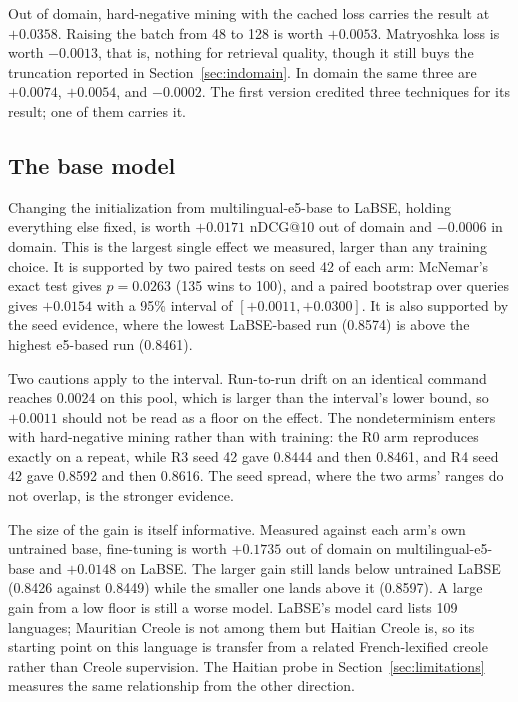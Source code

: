\documentclass[11pt]{article}
\begin{document}
Out of domain, hard-negative mining with the cached loss carries the result at $+0.0358$. Raising the
batch from 48 to 128 is worth $+0.0053$. Matryoshka loss is worth $-0.0013$, that is, nothing for
retrieval quality, though it still buys the truncation reported in Section~\ref{sec:indomain}. In domain
the same three are $+0.0074$, $+0.0054$, and $-0.0002$. The first version credited three techniques
for its result; one of them carries it.

\subsection{The base model}
\label{sec:basemodel}

Changing the initialization from multilingual-e5-base to LaBSE, holding everything else fixed, is
worth $+0.0171$ nDCG@10 out of domain and $-0.0006$ in domain. This is the largest single effect we
measured, larger than any training choice. It is supported by two paired tests on seed 42 of each
arm: McNemar's exact test gives $p = 0.0263$ (135 wins to 100), and a paired bootstrap over queries
gives $+0.0154$ with a 95\% interval of $[+0.0011, +0.0300]$. It is also supported by the seed
evidence, where the lowest LaBSE-based run (0.8574) is above the highest e5-based run (0.8461).

Two cautions apply to the interval. Run-to-run drift on an identical command reaches 0.0024 on this
pool, which is larger than the interval's lower bound, so $+0.0011$ should not be read as a floor on
the effect. The nondeterminism enters with hard-negative mining rather than with training: the R0 arm
reproduces exactly on a repeat, while R3 seed 42 gave 0.8444 and then 0.8461, and R4 seed 42 gave
0.8592 and then 0.8616. The seed spread, where the two arms' ranges do not overlap, is the stronger
evidence.

The size of the gain is itself informative. Measured against each arm's own untrained base,
fine-tuning is worth $+0.1735$ out of domain on multilingual-e5-base and $+0.0148$ on LaBSE. The
larger gain still lands below untrained LaBSE (0.8426 against 0.8449) while the smaller one lands
above it (0.8597). A large gain from a low floor is still a worse model. LaBSE's model card lists 109
languages; Mauritian Creole is not among them but Haitian Creole is, so its starting point on this
language is transfer from a related French-lexified creole rather than Creole supervision. The
Haitian probe in Section~\ref{sec:limitations} measures the same relationship from the other
direction.
\end{document}

